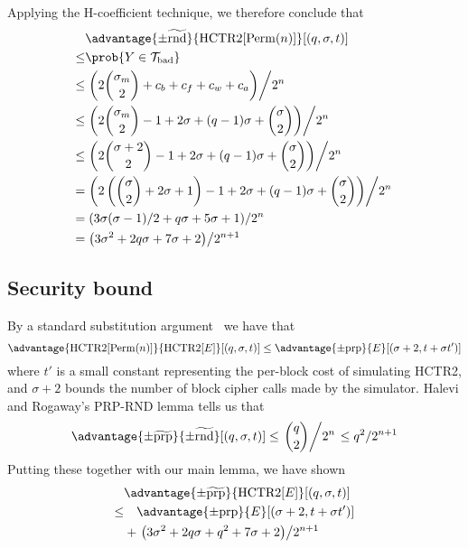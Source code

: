 \documentclass[hctr2.tex]{subfiles}
\begin{document}
Applying the H-coefficient technique, we therefore conclude that
\begin{align*}
    & \advantage{\pm\widetilde{\mathrm{rnd}}}{\HCTR[\Perm(n)]}[(q, \sigma, t)] \\
    \leq & \prob{Y \in \Tb} \\
    \leq & \left.\left(2\binom{\sigma_m}{2} + c_b + c_f + c_w + c_a\right)\middle/2^n\right. \\
    \leq & \left.\left(2\binom{\sigma_m}{2} - 1 + 2\sigma + (q-1)\sigma + \binom{\sigma}{2}\right)\middle/2^n\right. \\
    \leq & \left.\left(2\binom{\sigma + 2}{2} - 1 + 2\sigma + (q-1)\sigma + \binom{\sigma}{2}\right)\middle/2^n\right. \\
    = & \left.\left(2\left(\binom{\sigma}{2} + 2\sigma + 1\right) - 1 + 2\sigma + (q-1)\sigma + \binom{\sigma}{2}\right)\middle/2^n\right. \\
    = & \left.\left(3\sigma(\sigma - 1)/2 + q\sigma + 5\sigma + 1\right)\middle/2^n\right. \\
    = & \left.\left(3\sigma^2 + 2q\sigma + 7\sigma + 2\right)\middle/2^{n+1}\right.
\end{align*}

\subsection{Security bound}\label{securitybound}
By a standard substitution argument~\cite{cbcsec,concrete} we have that
\begin{displaymath}
    \advantage{\HCTR[\Perm(n)]}{\HCTR[E]}[(q, \sigma, t)]
    \leq \advantage{\pm \mathrm{prp}}{E}[(\sigma + 2, t + \sigma t')]
\end{displaymath}
where \(t'\) is a small constant
representing the per-block cost of simulating HCTR2, and
\(\sigma + 2\) bounds the number of block cipher calls made by the simulator.
Halevi and Rogaway's PRP-RND lemma
\cite[Appendix C, Lemma 6]{cmc} tells us that
\begin{displaymath}
    \advantage{\pm \widetilde{\mathrm{prp}}}{\pm\widetilde{\mathrm{rnd}}}[(q, \sigma, t)] 
    \leq \left.\binom{q}{2}\middle/2^n\right.
    \leq q^2/2^{n+1}
\end{displaymath}
Putting these together with our main lemma, we have shown
\begin{align*}
    &\advantage{\pm \widetilde{\mathrm{prp}}}{\HCTR[E]}[(q, \sigma, t)] \\
    \leq & \quad \advantage{\pm \mathrm{prp}}{E}[(\sigma + 2, t + \sigma t')] \\
    &+ \left.\left(3\sigma^2 + 2q\sigma + q^2 + 7\sigma + 2\right)\middle/2^{n+1}\right.
\end{align*}
\end{document}
